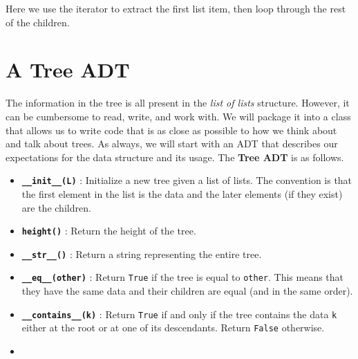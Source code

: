 Here we use the iterator to extract the first list item, then loop through the rest of the children.  

\section{A Tree ADT}


The information in the tree is all present in the \emph{list of lists} structure.
However, it can be cumbersome to read, write, and work with.
We will package it into a class that allows us to write code that is as close as possible to how we think about and talk about trees.
As always, we will start with an ADT that describes our expectations for the data structure and its usage.
The \textbf{Tree ADT} is as follows.

\begin{itemize}

\item 

\textbf{\texttt{\_\_init\_\_(L)}} : Initialize a new tree given a list of lists.  The convention is that the first element in the list is the data and the later elements (if they exist) are the children.



\item 

\textbf{\texttt{height()}} : Return the height of the tree.



\item 

\textbf{\texttt{\_\_str\_\_()}} : Return a string representing the entire tree.



\item 

\textbf{\texttt{\_\_eq\_\_(other)}} : Return \texttt{True} if the tree is equal to \texttt{other}.  This means that they have the same data and their children are equal (and in the same order).



\item 

\textbf{\texttt{\_\_contains\_\_(k)}} : Return \texttt{True} if and only if the tree contains the data \texttt{k} either at the root or at one of its descendants.  Return \texttt{False} otherwise.



\item 


\end{itemize}

